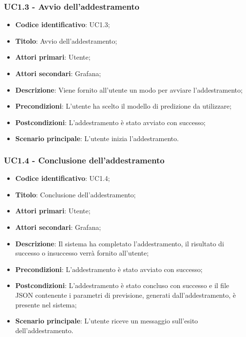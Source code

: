 	\subsubsection{UC1.3 - Avvio dell'addestramento}
	\begin{itemize}
		\item \textbf{Codice identificativo}: UC1.3;
		\item \textbf{Titolo}: Avvio dell'addestramento;
		\item \textbf{Attori primari}: Utente;
		\item \textbf{Attori secondari}: Grafana\glo;
		\item \textbf{Descrizione}: Viene fornito all'utente un modo per avviare l'addestramento;
		\item \textbf{Precondizioni}: L'utente ha scelto il modello di predizione da utilizzare;
		\item \textbf{Postcondizioni}: L'addestramento è stato avviato con successo;
		\item \textbf{Scenario principale}: L'utente inizia l'addestramento.
	\end{itemize}

	\subsubsection{UC1.4 - Conclusione dell'addestramento}
	\begin{itemize}
		\item \textbf{Codice identificativo}: UC1.4;
		\item \textbf{Titolo}: Conclusione dell'addestramento;
		\item \textbf{Attori primari}: Utente;
		\item \textbf{Attori secondari}: Grafana\glo;
		\item \textbf{Descrizione}: Il sistema ha completato l'addestramento, il risultato di successo o insuccesso verrà fornito all'utente;
		\item \textbf{Precondizioni}: L'addestramento è stato avviato con successo;
		\item \textbf{Postcondizioni}: L'addestramento è stato concluso con successo e il file JSON contenente i parametri di previsione, generati dall'addestramento, è presente nel sistema;
		\item \textbf{Scenario principale}: L'utente riceve un messaggio sull'esito dell'addestramento.
	\end{itemize}
